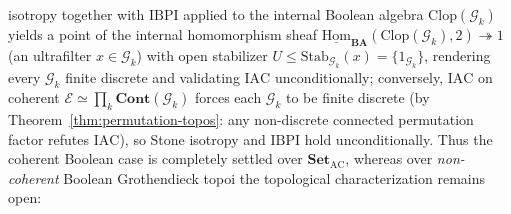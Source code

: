 \documentclass[10pt,twoside,openright]{book}
\theoremstyle{crmplain}
\theoremstyle{crmdef}
\theoremstyle{crmremark}
\begin{document}
isotropy together with $\mathrm{IBPI}$ applied to the internal Boolean algebra $\mathrm{Clop}(\mathcal{G}_k)$ yields a point of the internal homomorphism sheaf $\underline{\mathrm{Hom}}_{\mathbf{BA}}(\mathrm{Clop}(\mathcal{G}_k), 2) \twoheadrightarrow 1$ (an ultrafilter $x \in \mathcal{G}_k$) with open stabilizer $U \le \mathrm{Stab}_{\mathcal{G}_k}(x) = \{1_{\mathcal{G}_k}\}$, rendering every $\mathcal{G}_k$ finite discrete and validating $\mathrm{IAC}$ unconditionally; conversely, $\mathrm{IAC}$ on coherent $\mathcal{E} \simeq \prod_k \mathbf{Cont}(\mathcal{G}_k)$ forces each $\mathcal{G}_k$ to be finite discrete (by Theorem~\ref{thm:permutation-topos}: any non-discrete connected permutation factor refutes $\mathrm{IAC}$), so Stone isotropy and $\mathrm{IBPI}$ hold unconditionally. Thus the coherent Boolean case is completely settled over $\mathbf{Set}_{\mathrm{AC}}$, whereas over \emph{non-coherent} Boolean Grothendieck topoi the topological characterization remains open:
\end{document}
